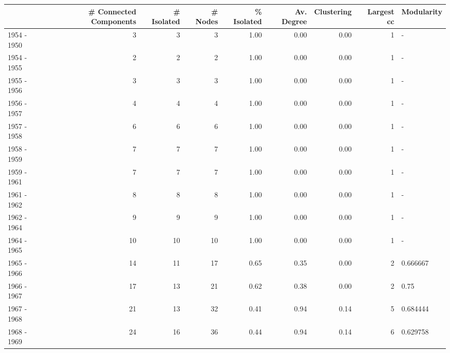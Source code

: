 \begin{tabular}{lrrrrrrrl}
\toprule
{} &  \# Connected Components &  \# Isolated &  \# Nodes &  \% Isolated &  Av. Degree &  Clustering &  Largest cc & Modularity \\
\midrule
1954 - 1950 &                       3 &           3 &        3 &        1.00 &        0.00 &        0.00 &           1 &          - \\
1954 - 1955 &                       2 &           2 &        2 &        1.00 &        0.00 &        0.00 &           1 &          - \\
1955 - 1956 &                       3 &           3 &        3 &        1.00 &        0.00 &        0.00 &           1 &          - \\
1956 - 1957 &                       4 &           4 &        4 &        1.00 &        0.00 &        0.00 &           1 &          - \\
1957 - 1958 &                       6 &           6 &        6 &        1.00 &        0.00 &        0.00 &           1 &          - \\
1958 - 1959 &                       7 &           7 &        7 &        1.00 &        0.00 &        0.00 &           1 &          - \\
1959 - 1961 &                       7 &           7 &        7 &        1.00 &        0.00 &        0.00 &           1 &          - \\
1961 - 1962 &                       8 &           8 &        8 &        1.00 &        0.00 &        0.00 &           1 &          - \\
1962 - 1964 &                       9 &           9 &        9 &        1.00 &        0.00 &        0.00 &           1 &          - \\
1964 - 1965 &                      10 &          10 &       10 &        1.00 &        0.00 &        0.00 &           1 &          - \\
1965 - 1966 &                      14 &          11 &       17 &        0.65 &        0.35 &        0.00 &           2 &   0.666667 \\
1966 - 1967 &                      17 &          13 &       21 &        0.62 &        0.38 &        0.00 &           2 &       0.75 \\
1967 - 1968 &                      21 &          13 &       32 &        0.41 &        0.94 &        0.14 &           5 &   0.684444 \\
1968 - 1969 &                      24 &          16 &       36 &        0.44 &        0.94 &        0.14 &           6 &   0.629758 \\

\end{tabular}
